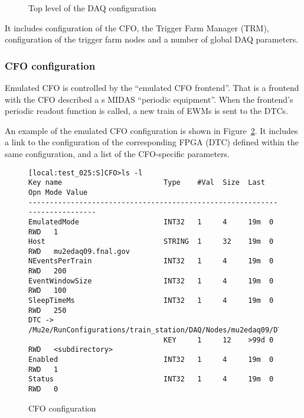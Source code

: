 \begin{figure}[H]
  \caption{
    \label{figure:daq_config}
    Top level of the DAQ configuration
  }
\end{figure}

It includes configuration of the CFO, the Trigger Farm Manager (TRM), configuration
of the trigger farm nodes and a number of global DAQ parameters.


\newpage
\subsubsection{CFO configuration}
\label{section:cfo}

Emulated CFO is controlled by the ``emulated CFO frontend''.
That is a frontend with the CFO described a s MIDAS ``periodic equipment''.
When the frontend's periodic readout function is called, a new train of EWMs
is sent to the DTCs.

An example of the emulated CFO configuration is shown in Figure~\ref{figure:cfo_config}.
It includes a link to the configuration of the corresponding FPGA (DTC) 
defined within the same configuration, and a list of the CFO-specific parameters.

\begin{figure}[H]
{ \scriptsize
\begin{verbatim}
[local:test_025:S]CFO>ls -l  
Key name                        Type    #Val  Size  Last Opn Mode Value
---------------------------------------------------------------------------
EmulatedMode                    INT32   1     4     19m  0  RWD   1
Host                            STRING  1     32    19m  0  RWD   mu2edaq09.fnal.gov
NEventsPerTrain                 INT32   1     4     19m  0  RWD   200
EventWindowSize                 INT32   1     4     19m  0  RWD   100
SleepTimeMs                     INT32   1     4     19m  0  RWD   250
DTC -> /Mu2e/RunConfigurations/train_station/DAQ/Nodes/mu2edaq09/DTC0
                                KEY     1     12    >99d 0  RWD   <subdirectory>
Enabled                         INT32   1     4     19m  0  RWD   1
Status                          INT32   1     4     19m  0  RWD   0
\end{verbatim}
}
\caption{
  \label{figure:cfo_config}
  CFO configuration
}
\end{figure}

